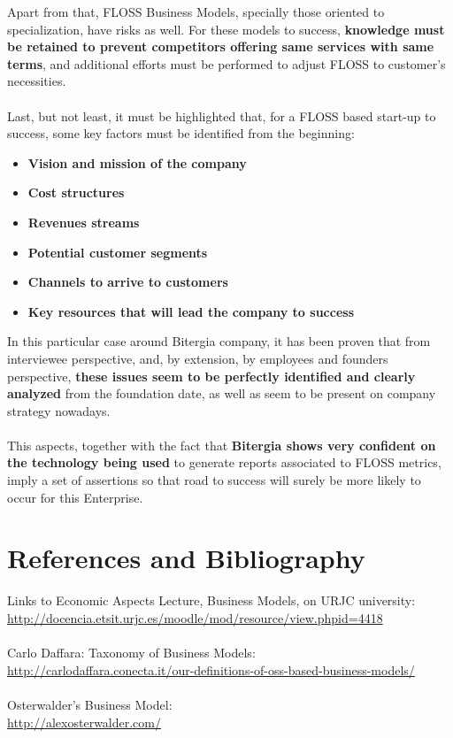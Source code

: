 \documentclass[11pt]{article}
\begin{document}
Apart from that, FLOSS Business Models, specially those oriented to specialization, have risks as well. For these models to success, \textbf{knowledge must be retained to prevent competitors offering same services with same terms}, and additional efforts must be performed to adjust FLOSS to customer's necessities.\\
\\
Last, but not least, it must be highlighted that, for a FLOSS based start-up to success, some key factors must be identified from the beginning:
\begin{itemize}\itemsep0.2pt
\item{\textbf{Vision and mission of the company}}
\item{\textbf{Cost structures}}
\item{\textbf{Revenues streams}}
\item{\textbf{Potential customer segments}}
\item{\textbf{Channels to arrive to customers}}
\item{\textbf{Key resources that will lead the company to success}}
\end{itemize}
In this particular case around Bitergia company, it has been proven that from interviewee perspective, and, by extension, by employees and founders perspective, \textbf{these issues seem to be perfectly identified and clearly analyzed} from the foundation date, as well as seem to be present on company strategy nowadays.\\
\\
This aspects, together with the fact that \textbf{Bitergia shows very confident on the technology being used} to generate reports associated to FLOSS metrics, imply a set of assertions so that road to success will surely be more likely to occur for this Enterprise.
\pagebreak
\section{References and Bibliography}
Links to Economic Aspects Lecture, Business Models, on URJC university:\\
\url{http://docencia.etsit.urjc.es/moodle/mod/resource/view.phpid=4418}\\
\\
Carlo Daffara: Taxonomy of Business Models:\\
\url{http://carlodaffara.conecta.it/our-definitions-of-oss-based-business-models/}\\
\\
Osterwalder's Business Model:\\
\url{http://alexosterwalder.com/}\\
\end{document}
